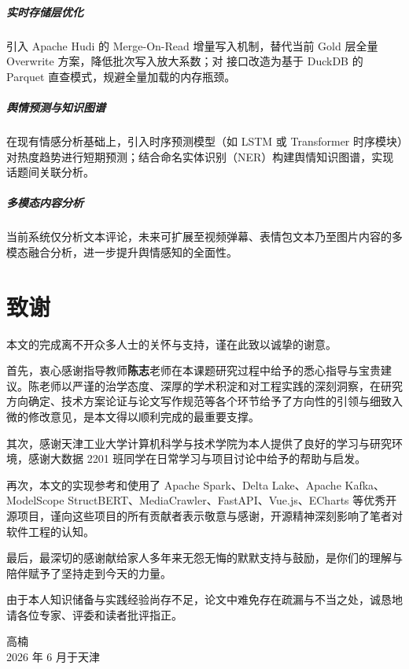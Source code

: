 \paragraph{实时存储层优化}引入 Apache Hudi 的 Merge-On-Read 增量写入机制，替代当前 Gold 层全量 Overwrite 方案，降低批次写入放大系数；对  接口改造为基于 DuckDB 的 Parquet 直查模式，规避全量加载的内存瓶颈。

\paragraph{舆情预测与知识图谱}在现有情感分析基础上，引入时序预测模型（如 LSTM 或 Transformer 时序模块）对热度趋势进行短期预测；结合命名实体识别（NER）构建舆情知识图谱，实现话题间关联分析。

\paragraph{多模态内容分析}当前系统仅分析文本评论，未来可扩展至视频弹幕、表情包文本乃至图片内容的多模态融合分析，进一步提升舆情感知的全面性。

\chapter*{致\quad 谢}

本文的完成离不开众多人士的关怀与支持，谨在此致以诚挚的谢意。

首先，衷心感谢指导教师\textbf{陈志}老师在本课题研究过程中给予的悉心指导与宝贵建议。陈老师以严谨的治学态度、深厚的学术积淀和对工程实践的深刻洞察，在研究方向确定、技术方案论证与论文写作规范等各个环节给予了方向性的引领与细致入微的修改意见，是本文得以顺利完成的最重要支撑。

其次，感谢天津工业大学计算机科学与技术学院为本人提供了良好的学习与研究环境，感谢大数据 2201 班同学在日常学习与项目讨论中给予的帮助与启发。

再次，本文的实现参考和使用了 Apache Spark、Delta Lake、Apache Kafka、ModelScope StructBERT、MediaCrawler、FastAPI、Vue.js、ECharts 等优秀开源项目，谨向这些项目的所有贡献者表示敬意与感谢，开源精神深刻影响了笔者对软件工程的认知。

最后，最深切的感谢献给家人多年来无怨无悔的默默支持与鼓励，是你们的理解与陪伴赋予了坚持走到今天的力量。

由于本人知识储备与实践经验尚存不足，论文中难免存在疏漏与不当之处，诚恳地请各位专家、评委和读者批评指正。

\vspace{2em}
\begin{flushright}
  高楠\\
  2026 年 6 月于天津
\end{flushright}
